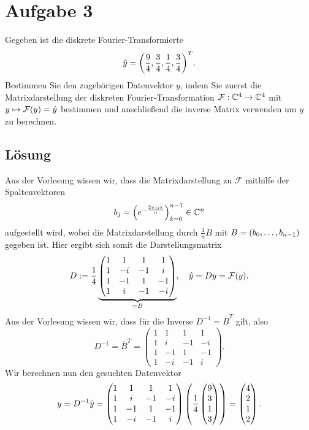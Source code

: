 \documentclass{exercise}
\begin{document}
    \section*{Aufgabe 3}

    \begin{problem}
        Gegeben ist die diskrete Fourier-Transformierte
        \[
            \hat{y} = \parentheses*{\frac{9}{4}, \frac{3}{4}, \frac{1}{4}, \frac{3}{4}}^T.
        \]
        Bestimmen Sie den zugehörigen Datenvektor \(y\), indem Sie zuerst die Matrixdarstellung der diskreten Fourier-Transformation \(\mathcal{F}: \C^4 \to \C^4\) mit \(y \mapsto \mathcal{F}\parentheses*{y} = \hat{y}\) bestimmen und anschließend die inverse Matrix verwenden um \(y\) zu berechnen.
    \end{problem}

    \subsection*{Lösung}
    Aus der Vorlesung wissen wir, dass die Matrixdarstellung zu \(\mathcal{F}\) mithilfe der Spaltenvektoren
    \[
        b_j = \parentheses*{e^{-\frac{2\pi ijk}{n}}}_{k = 0}^{n - 1} \in \C^n
    \]
    aufgestellt wird, wobei die Matrixdarstellung durch \(\frac{1}{n}B\) mit \(B = \parentheses*{b_0, \ldots, b_{n - 1}}\) gegeben ist.
    Hier ergibt sich somit die Darstellungsmatrix
    \[
        D := \frac{1}{4}\underbrace{\begin{pmatrix}
            1 & 1 & 1 & 1\\
            1 & -i & -1 & i\\
            1 & -1 & 1 & -1\\
            1 & i & -1 & -i
        \end{pmatrix}}_{= B}, \quad \hat{y} = Dy = \mathcal{F}\parentheses*{y}.
    \]
    Aus der Vorlesung wissen wir, dass für die Inverse \(D^{-1} = \overline{B}^T\) gilt, also
    \[
        D^{-1} = \overline{B}^T = \begin{pmatrix}
            1 & 1 & 1 & 1\\
            1 & i & -1 & -i\\
            1 & -1 & 1 & -1\\
            1 & -i & -1 & i
        \end{pmatrix}.
    \]
    Wir berechnen nun den gesuchten Datenvektor
    \[
        y = D^{-1}\hat{y} = \begin{pmatrix}
            1 & 1 & 1 & 1\\
            1 & i & -1 & -i\\
            1 & -1 & 1 & -1\\
            1 & -i & -1 & i
        \end{pmatrix}\parentheses*{\frac{1}{4}\begin{pmatrix}
            9\\3\\1\\3
        \end{pmatrix}} = \begin{pmatrix}
            4\\2\\1\\2
        \end{pmatrix}.
    \]
\end{document}
